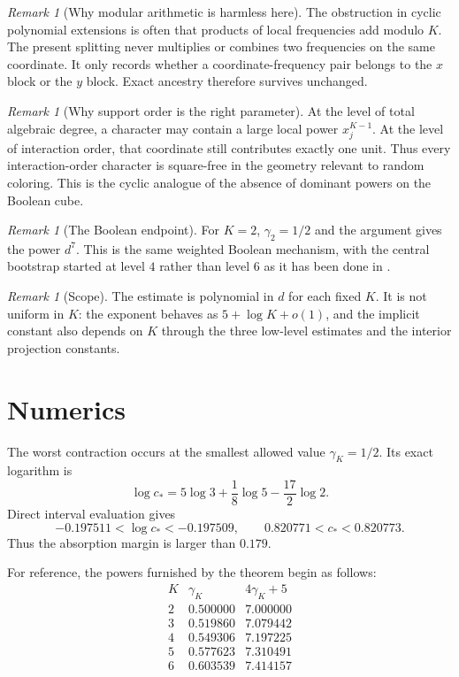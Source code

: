 \documentclass[11pt]{article}
\theoremstyle{definition}
\theoremstyle{remark}
\newtheorem{remark}[theorem]{Remark}
\begin{document}
\begin{remark}[Why modular arithmetic is harmless here]
The obstruction in cyclic polynomial extensions is often that products of
local frequencies add modulo $K$.  The present splitting never multiplies or
combines two frequencies on the same coordinate.  It only records whether a
coordinate-frequency pair belongs to the $x$ block or the $y$ block.  Exact
ancestry therefore survives unchanged.
\end{remark}

\begin{remark}[Why support order is the right parameter]
At the level of total algebraic degree, a character may contain a large local
power $x_j^{K-1}$.  At the level of interaction order, that coordinate still
contributes exactly one unit.  Thus every interaction-order character is
square-free in the geometry relevant to random coloring.  This is the cyclic
analogue of the absence of dominant powers on the Boolean cube.
\end{remark}

\begin{remark}[The Boolean endpoint]
For $K=2$, $\gamma_2=1/2$ and the argument gives the power $d^7$.  This is the
same weighted Boolean mechanism, with the central bootstrap started at level
$4$ rather than level $6$ as it has been done in \cite{SloteVolberg}.
\end{remark}

\begin{remark}[Scope]
The estimate is polynomial in $d$ for each fixed $K$.  It is not uniform in
$K$: the exponent behaves as $5+\log K+o(1)$, and the implicit constant also
depends on $K$ through the three low-level estimates and the interior
projection constants.
\end{remark}

\appendix


\section{Numerics}

The worst contraction occurs at the smallest allowed value
$\gamma_K=1/2$.  Its exact logarithm is
\[
 \log c_*
 =5\log3+\frac18\log5-\frac{17}{2}\log2.
\]
Direct interval evaluation gives
\[
 -0.197511<\log c_*<-0.197509,
 \qquad
 0.820771<c_*<0.820773.
\]
Thus the absorption margin is larger than $0.179$.

For reference, the powers furnished by the theorem begin as follows:
\[
\begin{array}{c|c|c}
K&\gamma_K&4\gamma_K+5\\
\hline
2&0.500000&7.000000\\
3&0.519860&7.079442\\
4&0.549306&7.197225\\
5&0.577623&7.310491\\
6&0.603539&7.414157
\end{array}
\]
\end{document}
